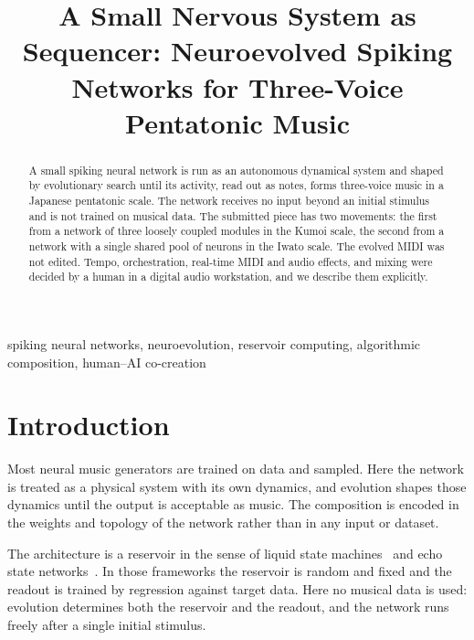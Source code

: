 \documentclass[conference]{IEEEtran}
\begin{document}
\title{A Small Nervous System as Sequencer: Neuroevolved Spiking Networks for Three-Voice Pentatonic Music}

\author{
}

\maketitle

\begin{abstract}
A small spiking neural network is run as an autonomous dynamical system and shaped by evolutionary search until its activity, read out as notes, forms three-voice music in a Japanese pentatonic scale. The network receives no input beyond an initial stimulus and is not trained on musical data. The submitted piece has two movements: the first from a network of three loosely coupled modules in the Kumoi scale, the second from a network with a single shared pool of neurons in the Iwato scale. The evolved MIDI was not edited. Tempo, orchestration, real-time MIDI and audio effects, and mixing were decided by a human in a digital audio workstation, and we describe them explicitly.
\end{abstract}

\begin{IEEEkeywords}
spiking neural networks, neuroevolution, reservoir computing, algorithmic composition, human--AI co-creation
\end{IEEEkeywords}

\section{Introduction}

Most neural music generators are trained on data and sampled. Here the network is treated as a physical system with its own dynamics, and evolution shapes those dynamics until the output is acceptable as music. The composition is encoded in the weights and topology of the network rather than in any input or dataset.

The architecture is a reservoir in the sense of liquid state machines~\cite{maass2002} and echo state networks~\cite{jaeger2001}. In those frameworks the reservoir is random and fixed and the readout is trained by regression against target data. Here no musical data is used: evolution determines both the reservoir and the readout, and the network runs freely after a single initial stimulus.
\end{document}
